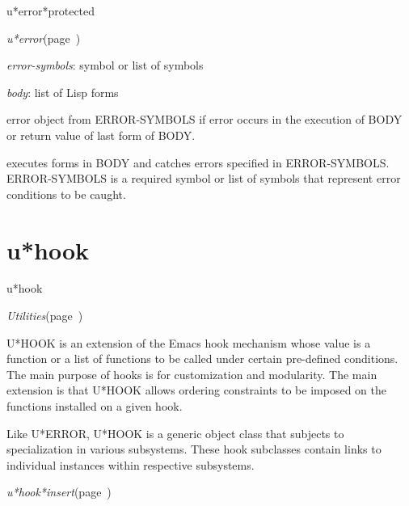 \begin{description}
\item [Name:]  u*error*protected

\item [Class:]
{\sl u*error}\hfill(page~\pageref{u*error})

\item [Parameters:]
\item {\sl error-symbols}:  symbol or list of symbols

\item {\sl body}:  list of Lisp forms


\item [Return-value:] 
error object from ERROR-SYMBOLS if error occurs in the
execution of BODY or return value of last form of BODY.

\item [Description:]
executes forms in BODY and catches errors specified in
ERROR-SYMBOLS.  ERROR-SYMBOLS is a required symbol or
list of symbols that represent error conditions to be
caught.  

\item [Public:]



\end{description}
\horizontalline

\section{u*hook}
\label{u*hook}

\begin{description}
\item [Name:]  u*hook

\item [Layer:] {\sl Utilities}\hfill(page~\pageref{Utilities})

\item [Description:] 
U*HOOK is an extension of the Emacs hook mechanism whose value
is a function or a list of functions to be called under certain
pre-defined conditions. The main purpose of hooks is for
customization and modularity. The main extension is that U*HOOK
allows ordering constraints to be imposed on the functions
installed on a given hook.

Like U*ERROR, U*HOOK is a generic object class that subjects to 
specialization in various subsystems. These hook subclasses contain
links to individual instances within respective subsystems. 

\item [Attributes:]

\item [Operations:]
\item {\sl u*hook*insert}\hfill(page~\pageref{u*hook*insert})

\item [Collections:]

\item [Subclasses:]

\item [Superclasses:]



\end{description}
\horizontalline

